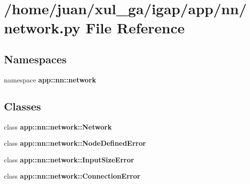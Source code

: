 \section{/home/juan/xul\_\-ga/igap/app/nn/network.py File Reference}
\label{network_8py}
\subsection*{Namespaces}
\begin{CompactItemize}
\item 
namespace {\bf app::nn::network}
\end{CompactItemize}
\subsection*{Classes}
\begin{CompactItemize}
\item 
class {\bf app::nn::network::Network}
\item 
class {\bf app::nn::network::NodeDefinedError}
\item 
class {\bf app::nn::network::InputSizeError}
\item 
class {\bf app::nn::network::ConnectionError}
\end{CompactItemize}
